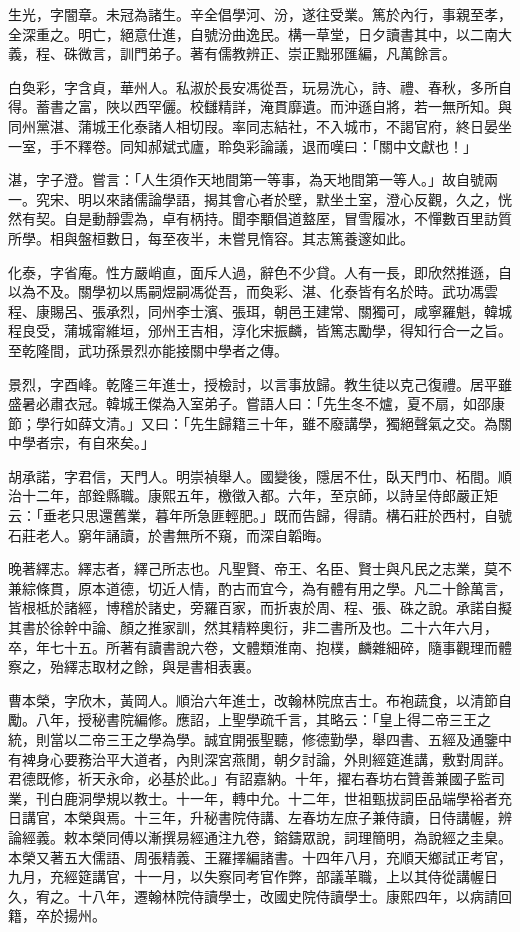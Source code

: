 \begin{pinyinscope}
生光，字闇章。未冠為諸生。辛全倡學河、汾，遂往受業。篤於內行，事親至孝，全深重之。明亡，絕意仕進，自號汾曲逸民。構一草堂，日夕讀書其中，以二南大義，程、硃微言，訓門弟子。著有儒教辨正、崇正黜邪匯編，凡萬餘言。

白奐彩，字含貞，華州人。私淑於長安馮從吾，玩易洗心，詩、禮、春秋，多所自得。蓄書之富，陜以西罕儷。校讎精詳，淹貫靡遺。而沖遜自將，若一無所知。與同州黨湛、蒲城王化泰諸人相切叚。率同志結社，不入城巿，不謁官府，終日晏坐一室，手不釋卷。同知郝斌式廬，聆奐彩論議，退而嘆曰：「關中文獻也！」

湛，字子澄。嘗言：「人生須作天地間第一等事，為天地間第一等人。」故自號兩一。究宋、明以來諸儒論學語，揭其會心者於壁，默坐土室，澄心反觀，久之，恍然有契。自是動靜雲為，卓有柄持。聞李顒倡道盩厔，冒雪履冰，不憚數百里訪質所學。相與盤桓數日，每至夜半，未嘗見惰容。其志篤養邃如此。

化泰，字省庵。性方嚴峭直，面斥人過，辭色不少貸。人有一長，即欣然推遜，自以為不及。關學初以馬嗣煜嗣馮從吾，而奐彩、湛、化泰皆有名於時。武功馮雲程、康賜呂、張承烈，同州李士濱、張珥，朝邑王建常、關獨可，咸寧羅魁，韓城程良受，蒲城甯維垣，邠州王吉相，淳化宋振麟，皆篤志勵學，得知行合一之旨。至乾隆間，武功孫景烈亦能接關中學者之傳。

景烈，字酉峰。乾隆三年進士，授檢討，以言事放歸。教生徒以克己復禮。居平雖盛暑必肅衣冠。韓城王傑為入室弟子。嘗語人曰：「先生冬不爐，夏不扇，如邵康節；學行如薛文清。」又曰：「先生歸籍三十年，雖不廢講學，獨絕聲氣之交。為關中學者宗，有自來矣。」

胡承諾，字君信，天門人。明崇禎舉人。國變後，隱居不仕，臥天門巾、柘間。順治十二年，部銓縣職。康熙五年，檄徵入都。六年，至京師，以詩呈侍郎嚴正矩云：「垂老只思還舊業，暮年所急匪輕肥。」既而告歸，得請。構石莊於西村，自號石莊老人。窮年誦讀，於書無所不窺，而深自韜晦。

晚著繹志。繹志者，繹己所志也。凡聖賢、帝王、名臣、賢士與凡民之志業，莫不兼綜條貫，原本道德，切近人情，酌古而宜今，為有體有用之學。凡二十餘萬言，皆根柢於諸經，博稽於諸史，旁羅百家，而折衷於周、程、張、硃之說。承諾自擬其書於徐幹中論、顏之推家訓，然其精粹奧衍，非二書所及也。二十六年六月，卒，年七十五。所著有讀書說六卷，文體類淮南、抱樸，麟雜細碎，隨事觀理而體察之，殆繹志取材之餘，與是書相表裏。

曹本榮，字欣木，黃岡人。順治六年進士，改翰林院庶吉士。布袍蔬食，以清節自勵。八年，授秘書院編修。應詔，上聖學疏千言，其略云：「皇上得二帝三王之統，則當以二帝三王之學為學。誠宜開張聖聽，修德勤學，舉四書、五經及通鑒中有裨身心要務治平大道者，內則深宮燕閒，朝夕討論，外則經筵進講，敷對周詳。君德既修，祈天永命，必基於此。」有詔嘉納。十年，擢右春坊右贊善兼國子監司業，刊白鹿洞學規以教士。十一年，轉中允。十二年，世祖甄拔詞臣品端學裕者充日講官，本榮與焉。十三年，升秘書院侍講、左春坊左庶子兼侍讀，日侍講幄，辨論經義。敕本榮同傅以漸撰易經通注九卷，鎔鑄眾說，詞理簡明，為說經之圭臬。本榮又著五大儒語、周張精義、王羅擇編諸書。十四年八月，充順天鄉試正考官，九月，充經筵講官，十一月，以失察同考官作弊，部議革職，上以其侍從講幄日久，宥之。十八年，遷翰林院侍讀學士，改國史院侍讀學士。康熙四年，以病請回籍，卒於揚州。


\end{pinyinscope}
